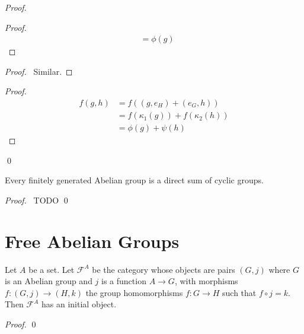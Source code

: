 \begin{proof}
\begin{proof}
\begin{align*}
                                     & = \phi(g)
        \end{align*}
    \end{proof}
    \begin{proof}
        \pf\ Similar.
    \end{proof}
    \begin{proof}
        \pf
        \begin{align*}
            f(g,h) & = f((g,e_H) + (e_G,h))            \\
                   & = f(\kappa_1(g)) + f(\kappa_2(h)) \\
                   & = \phi(g) + \psi(h)
        \end{align*}
    \end{proof}
    \qed
\end{proof}

\begin{thm}
Every finitely generated Abelian group is a direct sum of cyclic groups.
\end{thm}

\begin{proof}
\pf\ TODO \qed
\end{proof}

\section{Free Abelian Groups}

\begin{prop}
    Let $A$ be a set. Let $\mathcal{F}^A$ be the category whose objects are pairs $(G,j)$ where $G$ is an Abelian group and $j$ is a function $A \rightarrow G$, with morphisms $f : (G,j) \rightarrow (H,k)$ the group homomorphisms $f : G \rightarrow H$ such that $f \circ j = k$. Then $\mathcal{F}^A$ has an initial object.
\end{prop}

\begin{proof}
    \pf
    \qed
\end{proof}

